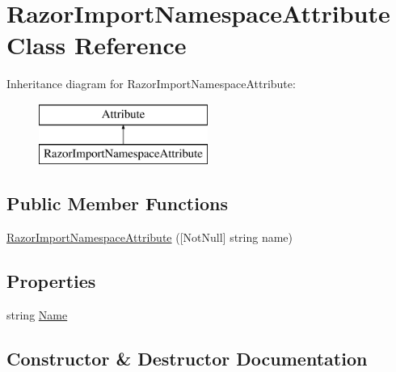 \hypertarget{class_razor_import_namespace_attribute}{}\section{Razor\+Import\+Namespace\+Attribute Class Reference}
\label{class_razor_import_namespace_attribute}
Inheritance diagram for Razor\+Import\+Namespace\+Attribute\+:\begin{figure}[H]
\begin{center}
\leavevmode
\includegraphics[height=2.000000cm]{class_razor_import_namespace_attribute}
\end{center}
\end{figure}
\subsection*{Public Member Functions}
\begin{DoxyCompactItemize}
\item 
\mbox{\hyperlink{class_razor_import_namespace_attribute_a429a9cd366bd26599ae9a704d513de50}{Razor\+Import\+Namespace\+Attribute}} (\mbox{[}Not\+Null\mbox{]} string name)
\end{DoxyCompactItemize}
\subsection*{Properties}
\begin{DoxyCompactItemize}
\item 
string \mbox{\hyperlink{class_razor_import_namespace_attribute_a9416e58cf9013104dd4d22007c417a89}{Name}}
\end{DoxyCompactItemize}


\subsection{Constructor \& Destructor Documentation}
\mbox{\label{class_razor_import_namespace_attribute_a429a9cd366bd26599ae9a704d513de50}} 
